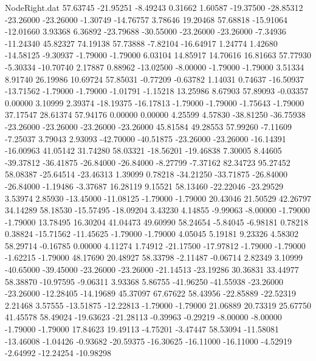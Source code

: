 \begin{filecontents}{NodeRight.dat}
  57.63745  -21.95251   -8.49243     0.31662    1.60587  -19.37500  -28.85312  -23.26000  -23.26000   -1.30749  -14.76757    3.78646   19.20468
  57.68818  -15.91064  -12.01660     3.93368    6.36892  -23.79688  -30.55000  -23.26000  -23.26000   -7.34936  -11.24340   45.82327   74.19138
  57.73888   -7.82104  -16.64917     1.24774    1.42680  -14.58125   -9.30937   -1.79000   -1.79000    6.03104   14.85917   14.70616   16.81663
  57.77930   -5.30334  -10.70740     2.17887    0.88962  -13.02500   -8.00000   -1.79000   -1.79000    3.51334    8.91740   26.19986   10.69724
  57.85031   -0.77209   -0.63782     1.14031    0.74637  -16.50937  -13.71562   -1.79000   -1.79000   -1.01791   -1.15218   13.25986    8.67903
  57.89093   -0.03357    0.00000     3.10999    2.39374  -18.19375  -16.17813   -1.79000   -1.79000   -1.75643   -1.79000   37.17547   28.61374
  57.94176    0.00000    0.00000     4.25599    4.57830  -38.81250  -36.75938  -23.26000  -23.26000  -23.26000  -23.26000   45.81584   49.28553
  57.99260   -7.11609   -7.25037     3.79043    2.93093  -42.70000  -40.51875  -23.26000  -23.26000  -16.14391  -16.00963   41.05142   31.74280
  58.03321  -18.56201  -19.46838     7.30005    8.44605  -39.37812  -36.41875  -26.84000  -26.84000   -8.27799   -7.37162   82.34723   95.27452
  58.08387  -25.64514  -23.46313     1.39099    0.78218  -34.21250  -33.71875  -26.84000  -26.84000   -1.19486   -3.37687   16.28119    9.15521
  58.13460  -22.22046  -23.29529     3.53974    2.85930  -13.45000  -11.08125   -1.79000   -1.79000   20.43046   21.50529   42.26797   34.14289
  58.18530  -15.57495  -18.09204     3.43230    4.14855   -9.99063   -8.00000   -1.79000   -1.79000   13.78495   16.30204   41.04473   49.60990
  58.24654   -5.84045   -6.98181     0.78218    0.38824  -15.71562  -11.45625   -1.79000   -1.79000    4.05045    5.19181    9.23326    4.58302
  58.29714   -0.16785    0.00000     4.11274    1.74912  -21.17500  -17.97812   -1.79000   -1.79000   -1.62215   -1.79000   48.17690   20.48927
  58.33798   -2.11487   -0.06714     2.82349    3.10999  -40.65000  -39.45000  -23.26000  -23.26000  -21.14513  -23.19286   30.36831   33.44977
  58.38870  -10.97595   -9.06311     3.93368    5.86755  -41.96250  -41.55938  -23.26000  -23.26000  -12.28405  -14.19689   45.37097   67.67622
  58.43956  -22.85889  -22.52319     2.21468    3.57555  -13.51875  -12.22813   -1.79000   -1.79000   21.06889   20.73319   25.67750   41.45578
  58.49024  -19.63623  -21.28113    -0.39963   -0.29219   -8.00000   -8.00000   -1.79000   -1.79000   17.84623   19.49113   -4.75201   -3.47447
  58.53094  -11.58081  -13.46008    -1.04426   -0.93682  -20.59375  -16.30625  -16.11000  -16.11000   -4.52919   -2.64992  -12.24254  -10.98298

\end{filecontents}
